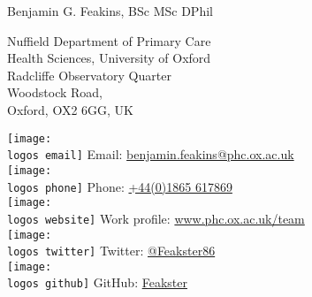 \documentclass[10pt,a4paper]{article}
\def\logos{./logos/}
\def\name{Benjamin G. Feakins, BSc MSc DPhil}
\begin{document}
{\huge \name}

\vspace{0.25in}

\begin{minipage}[t]{0.5\textwidth}
  \raggedright
  Nuffield Department of Primary Care \\
  Health Sciences, University of Oxford \\
  Radcliffe Observatory Quarter \\
  Woodstock Road, \\
  Oxford, OX2 6GG, UK \\
\end{minipage}\begin{minipage}[t]{0.5\textwidth}
  \raggedright
  \texttt{[image: \\logos email]} Email: \href{mailto:benjamin.feakins@phc.ox.ac.uk}{benjamin.feakins@phc.ox.ac.uk} \\
  \texttt{[image: \\logos phone]} Phone: \href{tel:441865617869}{+44(0)1865 617869} \\
  \texttt{[image: \\logos website]} Work profile: \href{https://www.phc.ox.ac.uk/team/ben-feakins}{www.phc.ox.ac.uk/team} \\
  \texttt{[image: \\logos twitter]} Twitter:  \href{https://twitter.com/Feakster86}{@Feakster86} \\
  \texttt{[image: \\logos github]} GitHub: \href{https://github.com/Feakster}{Feakster} \\
\end{minipage}

\vspace{0.25in}

\sloppy
\end{document}

